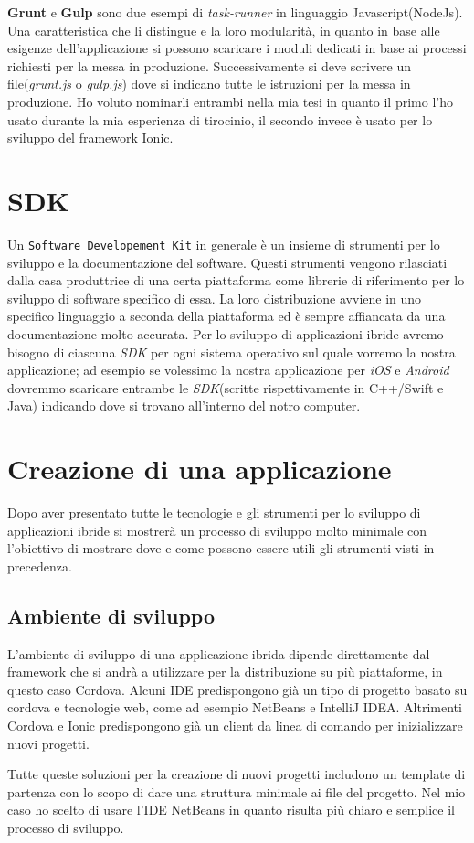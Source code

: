 \textbf{Grunt} e \textbf{Gulp} sono due esempi di \emph{task-runner} in linguaggio Javascript(NodeJs). Una caratteristica che li distingue e la loro modularità, in quanto in base alle esigenze dell'applicazione si possono scaricare i moduli dedicati in base ai processi richiesti per la messa in produzione. Successivamente si deve scrivere un file(\textit{grunt.js} o \textit{gulp.js}) dove si indicano tutte le istruzioni per la messa in produzione. Ho voluto nominarli entrambi nella mia tesi in quanto il primo l'ho usato durante la mia esperienza di tirocinio, il secondo invece è usato per lo sviluppo del framework Ionic.


\section{SDK}
Un \texttt{Software Developement Kit} in generale è un insieme di strumenti per lo sviluppo e la documentazione del software\cite{wiki:sdk}. Questi strumenti vengono rilasciati dalla casa produttrice di una certa piattaforma come librerie di riferimento per lo sviluppo di software specifico di essa. La loro distribuzione avviene in uno specifico linguaggio a seconda della piattaforma ed è sempre affiancata da una documentazione molto accurata. 
Per lo sviluppo di applicazioni ibride avremo bisogno di ciascuna \emph{SDK} per ogni sistema operativo sul quale vorremo la nostra applicazione; ad esempio se volessimo la nostra applicazione per \emph{iOS} e \emph{Android} dovremmo scaricare entrambe le \emph{SDK}(scritte rispettivamente in C++/Swift e Java) indicando dove si trovano all'interno del notro computer.

\section{Creazione di una applicazione}

Dopo aver presentato tutte le tecnologie e gli strumenti per lo sviluppo di applicazioni ibride si mostrerà un processo di sviluppo molto minimale con l'obiettivo di mostrare dove e come possono essere utili gli strumenti visti in  precedenza.

\subsection{Ambiente di sviluppo}

L'ambiente di sviluppo di una applicazione ibrida dipende direttamente dal framework che si andrà a utilizzare per la distribuzione su più piattaforme, in questo caso Cordova. Alcuni IDE predispongono già un tipo di progetto basato su cordova e tecnologie web, come ad esempio NetBeans e IntelliJ IDEA. Altrimenti Cordova e Ionic predispongono già un client da linea di comando per inizializzare nuovi progetti.

Tutte queste soluzioni per la creazione di nuovi progetti includono un template di partenza con lo scopo di dare una struttura minimale ai file del progetto. Nel mio caso ho scelto di usare l'IDE NetBeans in quanto risulta più chiaro e semplice il processo di sviluppo.


